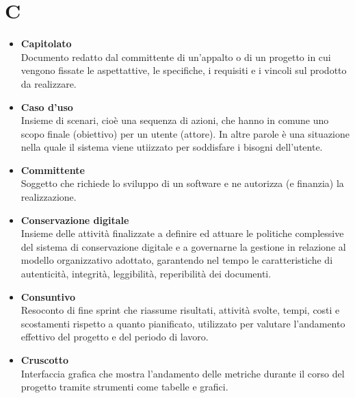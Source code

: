 \documentclass[a4paper,12pt]{article}
\begin{document}
        \section*{C} {
            \begin{itemize}
                \item \textbf{Capitolato}\\
                    Documento redatto dal committente di un'appalto o di un progetto in cui vengono fissate le aspettattive, le specifiche, i requisiti e i vincoli sul prodotto da realizzare.
                \item \textbf{Caso d'uso}\\
                    Insieme di scenari, cioè una sequenza di azioni, che hanno in comune uno scopo finale (obiettivo) per un utente (attore). In altre parole è una situazione nella quale il sistema viene utiizzato per soddisfare i bisogni dell'utente.
                \item \textbf{Committente}\\
                    Soggetto che richiede lo sviluppo di un software e ne autorizza (e finanzia) la realizzazione.
                \item \textbf{Conservazione digitale}\\
                    Insieme delle attività finalizzate a definire ed attuare le politiche complessive del sistema di conservazione digitale e a governarne la gestione in relazione al modello organizzativo adottato, garantendo nel tempo le caratteristiche di autenticità, integrità, leggibilità, reperibilità dei documenti.
                \item \textbf{Consuntivo}\\
                    Resoconto di fine sprint che riassume risultati, attività svolte, tempi, costi e scostamenti rispetto a quanto pianificato, utilizzato per valutare l'andamento effettivo del progetto e del periodo di lavoro.
                \item \textbf{Cruscotto}\\
                    Interfaccia grafica che mostra l'andamento delle metriche durante il corso del progetto tramite strumenti come tabelle e grafici.
            \end{itemize}
        }
        \newpage
\end{document}
